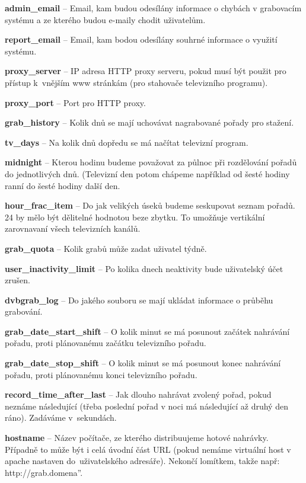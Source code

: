 \item\textbf{admin\_email} -- Email, kam budou odesílány informace o chybách v grabovacím systému a ze kterého budou e-maily chodit uživatelům.
\item\textbf{report\_email} -- Email, kam bodou odesílány souhrné informace o využití systému.
\item\textbf{proxy\_server} -- IP adresa HTTP proxy serveru, pokud musí být použit pro přístup k~vnějším www stránkám (pro stahovače televizního programu).
\item\textbf{proxy\_port} -- Port pro HTTP proxy.
\item\textbf{grab\_history} -- Kolik dnů se mají uchovávat nagrabované pořady pro stažení.
\item\textbf{tv\_days} -- Na kolik dnů dopředu se má načítat televizní program.
\item\textbf{midnight} -- Kterou hodinu budeme považovat za půlnoc při rozdělování pořadů do jednotlivých dnů. (Televizní den potom chápeme například od šesté hodiny ranní do šesté hodiny další den.
\item\textbf{hour\_frac\_item} -- Do jak velikých úseků budeme seskupovat seznam pořadů. 24 by mělo být dělitelné hodnotou beze zbytku. To umožňuje vertikální zarovnavaní všech televizních kanálů.
\item\textbf{grab\_quota} -- Kolik grabů může zadat uživatel týdně.
\item\textbf{user\_inactivity\_limit} -- Po kolika dnech neaktivity bude uživatelský účet zrušen.
\item\textbf{dvbgrab\_log} -- Do jakého souboru se mají ukládat informace o průběhu grabování.
\item\textbf{grab\_date\_start\_shift} -- O kolik minut se má posunout začátek nahrávání pořadu, proti plánovanému začátku televizního pořadu.
\item\textbf{grab\_date\_stop\_shift} -- O kolik minut se má posunout konec nahrávání pořadu, proti plánovanému konci televizního pořadu.
\item\textbf{record\_time\_after\_last} -- Jak dlouho nahrávat zvolený pořad, pokud neznáme následující (třeba poslední pořad v noci má následující až druhý den ráno). Zadáváme v~sekundách.
\item\textbf{hostname} -- Název počítače, ze kterého distribuujeme hotové nahrávky. Případně to může být i celá úvodní část URL (pokud nemáme virtuální host v apache nastaven do~uživatelského adresáře). Nekončí lomítkem, takže např: \quotedblbase http://grab.domena''.
